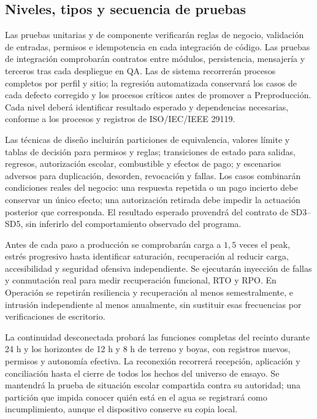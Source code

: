 \subsection{Niveles, tipos y secuencia de pruebas}
Las pruebas unitarias y de componente verificarán reglas de negocio, validación de entradas, permisos e idempotencia en cada integración de código. Las pruebas de integración comprobarán contratos entre módulos, persistencia, mensajería y terceros tras cada despliegue en QA. Las de sistema recorrerán procesos completos por perfil y sitio; la regresión automatizada conservará los casos de cada defecto corregido y los procesos críticos antes de promover a Preproducción. Cada nivel deberá identificar resultado esperado y dependencias necesarias, conforme a los procesos y registros de ISO/IEC/IEEE 29119. \parencites{sd9-29119-2,sd9-29119-3}[20.1, p.~34]{sd9-bt}

Las técnicas de diseño incluirán particiones de equivalencia, valores límite y tablas de decisión para permisos y reglas; transiciones de estado para salidas, regresos, autorización escolar, combustible y efectos de pago; y escenarios adversos para duplicación, desorden, revocación y fallas. Los casos combinarán condiciones reales del negocio: una respuesta repetida o un pago incierto debe conservar un único efecto; una autorización retirada debe impedir la actuación posterior que corresponda. El resultado esperado provendrá del contrato de SD3--SD5, sin inferirlo del comportamiento observado del programa. \parencite{sd9-29119-4}

Antes de cada paso a producción se comprobarán carga a $1,5$ veces el peak, estrés progresivo hasta identificar saturación, recuperación al reducir carga, accesibilidad y seguridad ofensiva independiente. Se ejecutarán inyección de fallas y conmutación real para medir recuperación funcional, RTO y RPO. En Operación se repetirán resiliencia y recuperación al menos semestralmente, e intrusión independiente al menos anualmente, sin sustituir esas frecuencias por verificaciones de escritorio. \parencite[20.1, p.~34]{sd9-bt}

La continuidad desconectada probará las funciones completas del recinto durante 24 h y los horizontes de 12 h y 8 h de terreno y boyas, con registros nuevos, permisos y autonomía efectiva. La reconexión recorrerá recepción, aplicación y conciliación hasta el cierre de todos los hechos del universo de ensayo. Se mantendrá la prueba de situación escolar compartida contra su autoridad; una partición que impida conocer quién está en el agua se registrará como incumplimiento, aunque el dispositivo conserve su copia local. \parencites[cap.~15, RT-03.10/13, p.~34; RT-05.29, p.~35]{sd9-c07}[sec.~5.4]{sd9-sd5}

